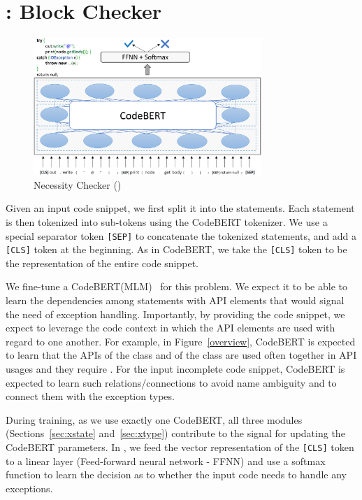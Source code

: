 \section{{\xblock}:  Block Checker}
\label{xblock:sec}

\begin{figure}[t]
 	\centering
 	\includegraphics[width=3.4in]{xblock-4.png}
        \vspace{-20pt}
 	\caption{ Necessity Checker ({\xblock})}
 	\label{fig:xblock}	
\end{figure}

Given an input code snippet, we first split it into the
statements. Each statement is then tokenized into sub-tokens using the
CodeBERT tokenizer. We use a special separator token \texttt{[SEP]} to
concatenate the tokenized statements, and add a \texttt{[CLS]} token
at the beginning. As in CodeBERT, we take the \texttt{[CLS]} token to
be the representation of the entire code snippet.

We fine-tune a CodeBERT(MLM)~\cite{codebertMLM} for this problem.
We expect it to be able to learn the dependencies among statements
with API elements that would signal the need of exception
handling. Importantly, by providing the code snippet, we expect to
leverage the code context in which the API elements are used with
regard to one another. For example, in Figure~\ref{overview}, CodeBERT
is expected to learn that the APIs  of the
class  and  of the class
 are used often together in API usages and they
require . For the input incomplete code snippet,
CodeBERT is expected to learn such relations/connections to avoid name
ambiguity and to connect them with the exception types.


During training, as we use exactly one CodeBERT, all three modules
(Sections~\ref{sec:xstate} and~\ref{sec:xtype}) contribute
to the signal for updating the CodeBERT parameters. In {\xblock}, we
feed the vector representation of the \texttt{[CLS]} token to a linear
layer (Feed-forward neural network - FFNN) and use a softmax function
to learn the decision as to whether the input code needs to handle any
exceptions.

